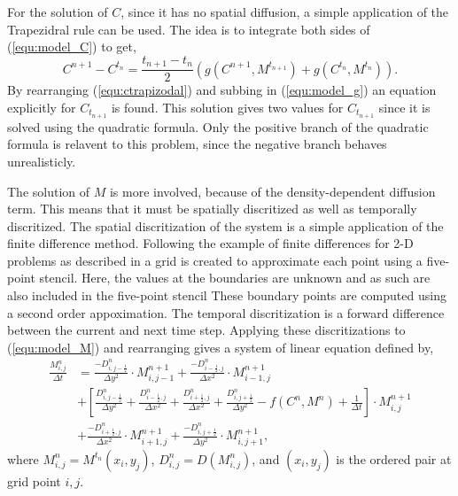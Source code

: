 \documentclass{article}
\theoremstyle{plain}
\begin{document}
  For the solution of $C$, since it has no spatial diffusion, a simple application of the Trapezidral rule can be used.
  The idea is to integrate both sides of (\ref{equ:model_C}) to get,
  \begin{equation} \label{equ:ctrapizodal}
    C^{n+1} - C^{t_n} = \frac{t_{n+1} - t_{n}}{2} \left( g(C^{n+1}, M^{t_{n+1}}) + g(C^{t_n}, M^{t_n}) \right).
  \end{equation}
  By rearranging (\ref{equ:ctrapizodal}) and subbing in (\ref{equ:model_g}) an equation explicitly for $C_{t_{n+1}}$ is found.
  This solution gives two values for $C_{t_{n+1}}$ since it is solved using the quadratic formula.
  Only the positive branch of the quadratic formula is relavent to this problem, since the negative branch behaves unrealisticly.
  
  The solution of $M$ is more involved, because of the density-dependent diffusion term.
  This means that it must be spatially discritized as well as temporally discritized. 
  The spatial discritization of the system is a simple application of the finite difference method.
  Following the example of finite differences for 2-D problems as described in \cite{saad2003iterativeMethod} a grid is created to approximate each point using a five-point stencil.
  Here, the values at the boundaries are unknown and as such are also included in the five-point stencil
  These boundary points are computed using a second order appoximation.
  The temporal discritization is a forward difference between the current and next time step.
  Applying these discritizations to (\ref{equ:model_M}) and rearranging gives a system of linear equation defined by,
  \begin{equation} \label{equ:discritizeM}
  \begin{aligned}
    \frac{M^n_{i,j}}{\Delta t} &= \frac{-D^n_{i,j-\frac{1}{2}}}{\Delta y ^2} \cdot M^{n+1}_{i,j-1} + \frac{-D^n_{i-\frac{1}{2},j}}{\Delta x ^2} \cdot M^{n+1}_{i-1,j}  \\
    &  +  \left[ \frac{D^n_{i,j-\frac{1}{2}}}{\Delta y ^2} + \frac{D^n_{i-\frac{1}{2},j}}{\Delta x ^2} + \frac{D^n_{i+\frac{1}{2},j}}{\Delta x ^2} + \frac{D^n_{i,j+\frac{1}{2}}}{\Delta y ^2} - f(C^n, M^n) + \frac{1}{\Delta t} \right] \cdot M^{n+1}_{i,j}  \\
    &  + \frac{-D^n_{i+\frac{1}{2},j}}{\Delta x ^2} \cdot M^{n+1}_{i+1,j} + \frac{-D^n_{i,j+\frac{1}{2}}}{\Delta y ^2} \cdot M^{n+1}_{i,j+1},
  \end{aligned}
  \end{equation} 
  where $M^n_{i,j} = M^{t_n}(x_i,y_j)$, $D^n_{i,j} = D(M^n_{i,j})$, and $(x_i,y_j)$ is the ordered pair at grid point $i,j$.
  
\end{document}
